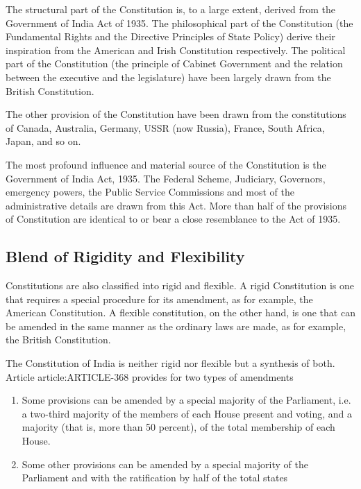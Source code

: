 \begin{multicol}{2}
The structural part of the Constitution is, to a large extent, derived from the Government of India Act of 1935. The philosophical part of the Constitution (the Fundamental Rights and the Directive Principles of State Policy) derive their inspiration from the American and Irish Constitution respectively. The political part of the Constitution (the principle of Cabinet Government and the relation between the executive and the legislature) have been largely drawn from the British Constitution.

The other provision of the Constitution have been drawn from the constitutions of Canada, Australia, Germany, USSR (now Russia), France, South Africa, Japan, and so on.

The most profound influence and material source of the Constitution is the Government of India Act, 1935. The Federal Scheme, Judiciary, Governors, emergency powers, the Public Service Commissions and most of the administrative details are drawn from this Act. More than half of the provisions of Constitution are identical to or bear a close resemblance to the Act of 1935.

\subsection{Blend of Rigidity and Flexibility}

Constitutions are also classified into rigid and flexible. A rigid Constitution is one that requires a special procedure for its amendment, as for example, the American Constitution. A flexible constitution, on the other hand, is one that can be amended in the same manner as the ordinary laws are made, as for example, the British Constitution.

The Constitution of India is neither rigid nor flexible but a synthesis of both. Article \gls{article:ARTICLE-368} provides for two types of amendments

\renewcommand{\labelenumi}{\textbf{(\alph{enumi})}}
\begin{enumerate}
  \item Some provisions can be amended by a special majority of the Parliament, i.e. a two-third majority of the members of each House present and voting, and a majority (that is, more than 50 percent), of the total membership of each House.
  \item Some other provisions can be amended by a special majority of the Parliament and with the ratification by half of the total states
\end{enumerate}


\end{multicol}

